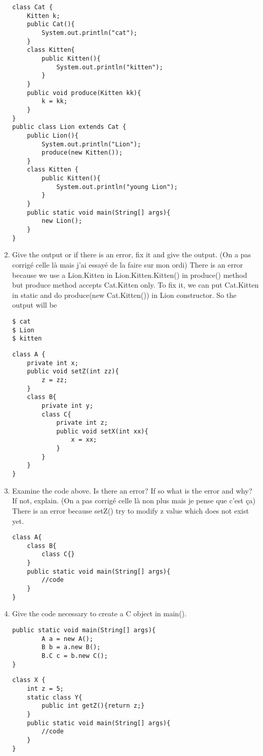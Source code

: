 \documentclass{article}
\begin{document}
\begin{enumerate}
\begin{lstlisting}
class Cat {
 	Kitten k;
 	public Cat(){
  		System.out.println("cat");
 	}
 	class Kitten{
  		public Kitten(){
   			System.out.println("kitten");
  		}
 	}
 	public void produce(Kitten kk){
   		k = kk;
 	}
}
public class Lion extends Cat {
 	public Lion(){
  		System.out.println("Lion");
  		produce(new Kitten());
 	}
 	class Kitten {
  		public Kitten(){
   			System.out.println("young Lion");
  		}
 	}
 	public static void main(String[] args){
  		new Lion();
 	}
}
\end{lstlisting}
	\item Give the output or if there is an error, fix it and give the output.\newline
	(On a pas corrigé celle là mais j'ai essayé de la faire sur mon ordi) There is an error because we use a Lion.Kitten in Lion.Kitten.Kitten() in produce() method but produce method accepts Cat.Kitten only. To fix it, we can put Cat.Kitten in static and do produce(new Cat.Kitten()) in Lion constructor. So the output will be
\begin{lstlisting}
$ cat
$ Lion
$ kitten
\end{lstlisting}
\begin{lstlisting}
class A {
 	private int x;
 	public void setZ(int zz){
 		z = zz;
 	}
 	class B{
  		private int y;
  		class C{
   			private int z;
   			public void setX(int xx){
   				x = xx;
   			}
  		}
 	}
}
\end{lstlisting}
	\item Examine the code above. Is there an error? If so what is the error and why? If not, explain. (On a pas corrigé celle là non plus mais je pense que c'est ça)\newline
	There is an error because setZ() try to modify z value which does not exist yet.
\begin{lstlisting}
class A{
 	class B{
  		class C{}
 	}
	public static void main(String[] args){
 		//code
	}
}
\end{lstlisting}
	\item Give the code necessary to create a C object in main().
\begin{lstlisting}
public static void main(String[] args){
        A a = new A();
        B b = a.new B();
        B.C c = b.new C();
}
\end{lstlisting}
	\newpage
\begin{lstlisting}
class X {
 	int z = 5;
 	static class Y{
  		public int getZ(){return z;}
 	}
 	public static void main(String[] args){
 		//code
 	}
}
\end{lstlisting}

\end{enumerate}
\end{document}
